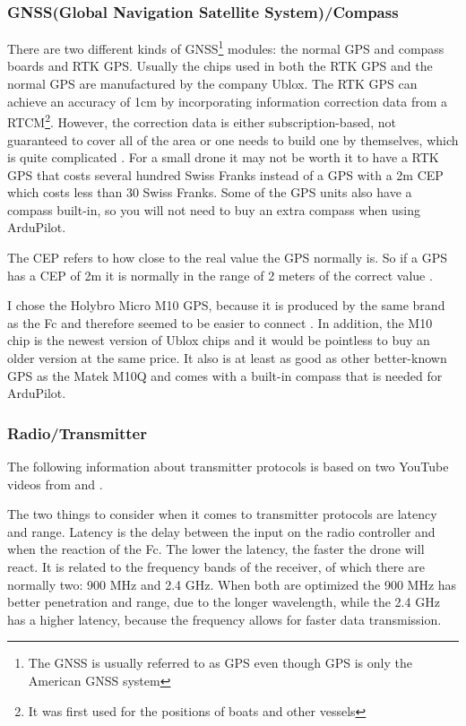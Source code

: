 \documentclass[svgnames]{article}
\begin{document}
	\subsubsection{GNSS(Global Navigation Satellite System)/Compass}
	There are two different kinds of \gls{GNSS}\footnote{The \gls{GNSS} is usually referred to as \gls{GPS} even though \gls{GPS} is only the American \gls{GNSS} system} modules: the normal \gls{GPS} and compass boards and \gls{RTK} \gls{GPS}. Usually the chips used in both the RTK GPS and the normal GPS are manufactured by the company Ublox. The RTK GPS can achieve an accuracy of 1cm by incorporating information correction data from a \gls{RTCM}\footnote{It was first used for the positions of boats and other vessels}. However, the correction data is either subscription-based, not guaranteed to cover all of the area or one needs to build one by themselves, which is quite complicated \cite{rtkgps}. For a small drone it may not be worth it to have a \gls{RTK} \gls{GPS} that costs several hundred Swiss Franks instead of a \gls{GPS} with a 2m \gls{CEP} which costs less than 30 Swiss Franks. Some of the \gls{GPS} units also have a compass built-in, so you will not need to buy an extra compass when using ArduPilot. 
	\begin{Explanation}
		\item The \gls{CEP} refers to how close to the real value the \gls{GPS} normally is. So if a \gls{GPS} has a \gls{CEP}
		of 2m it is normally in the range of 2 meters of the correct value \cite{CEP}.
	\end{Explanation}
	
	I chose the Holybro Micro M10 \gls{GPS}, because it is produced by the same brand as the Fc and therefore seemed to be easier to connect \cite{holybrom10micro}. In addition, the M10 chip is the newest version of Ublox chips and it would be pointless to buy an older version at the same price. It also is at least as good as other better-known GPS as the Matek M10Q \cite{gpstest} and comes with a built-in compass that is needed for ArduPilot.

	\subsubsection{Radio/Transmitter}
	The following information about transmitter protocols is based on two YouTube videos from \textcite{transprotocols} and \textcite{mlrs}.
	
	The two things to consider when it comes to transmitter protocols are latency and range. Latency is the delay between the input on the radio controller and when the reaction of the \gls{Fc}. The lower the latency, the faster the drone will react. It is related to the frequency bands of the receiver, of which there are normally two: 900 MHz and 2.4 GHz. When both are optimized the 900 MHz has better penetration and range, due to the longer wavelength, while the 2.4 GHz has a higher latency, because the frequency allows for faster data transmission.
\end{document}
